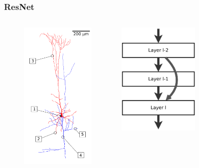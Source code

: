 \documentclass[12pt, aspectratio=169]{beamer}
\begin{document}
\begin{frame}
  \frametitle{ResNet}
  \begin{columns}
    \begin{column}{0.45\textwidth}
      \begin{figure}
        \includegraphics[width=0.45\linewidth]{800px-Piramidal_cell}
      \end{figure}
    \end{column}
    \begin{column}{0.55\textwidth}
      \includegraphics[width=0.55\textwidth]{800px-ResNets}
    \end{column}
  \end{columns}
\end{frame}
\end{document}
